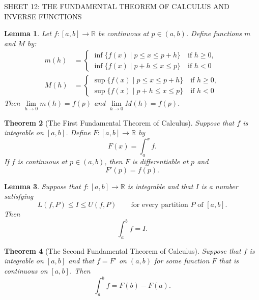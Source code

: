 \documentclass[12pt]{article}
\newcommand{\bbR}{\mathbb{R}}
\providecommand{\arr}{\longrightarrow}
\renewcommand{\_}[1]{\underline{ #1 }}
\newtheorem{theorem}{Theorem}[section]
\newtheorem{lemma}[theorem]{Lemma}
\theoremstyle{definition}
\numberwithin{equation}{subsection}
\begin{document}
\begin{center}
{\large SHEET 12: THE FUNDAMENTAL THEOREM OF CALCULUS AND INVERSE FUNCTIONS} \\ 
\end{center}

\bigskip \bigskip


\setcounter{section}{12}   


\begin{lemma}  Let $f \colon [a, b] \arr \bbR$ be continuous at $p \in (a, b)$.  Define functions $m$ and $M$ by:
\begin{align*}
m(h) &= \begin{cases} 
\inf \{ f(x) \mid p \leq x \leq p + h \} \quad \text{if $h \geq 0$} , \\
\inf \{ f(x) \mid p + h \leq x \leq p \}  \quad \text{if $h < 0$} 
\end{cases} \\
M(h) &= \begin{cases} 
\sup \{ f(x) \mid p \leq x \leq p + h \} \quad \text{if $h \geq 0$} , \\
\sup \{ f(x) \mid p + h \leq x \leq p \}  \quad \text{if $h < 0$} 
\end{cases}\end{align*}
Then $\lim\limits_{h \rightarrow 0} m(h) = f(p)$ and $\lim\limits_{h \rightarrow 0} M(h) = f(p)$.
\end{lemma}

\begin{theorem}[The First Fundamental Theorem of Calculus]  Suppose that $f$ is integrable on $[a, b]$.  Define $F \colon [a, b] \arr \bbR$ by
\[
F(x) = \int_{a}^{x} f.
\]
If $f$ is continuous at $p \in (a, b)$, then $F$ is differentiable at $p$ and
\[
F'(p) = f(p).
\]
\end{theorem}

\begin{lemma}  Suppose that $f \colon [a, b] \arr \bbR$ is integrable and that $I$ is a number satisfying
\[
L(f, P) \leq I \leq U(f, P) \qquad \text{for every partition $P$ of $[a, b]$.}
\]
Then 
\[
\int_{a}^{b} f = I.
\]
\end{lemma}

\begin{theorem}[The Second Fundamental Theorem of Calculus]
Suppose that $f$ is integrable on $[a, b]$ and that $f = F'$ on $(a,b)$ for some function $F$ that is continuous on $[a,b]$.  Then
\[
\int_{a}^{b} f = F(b) - F(a).
\]
\end{theorem}
\end{document}
